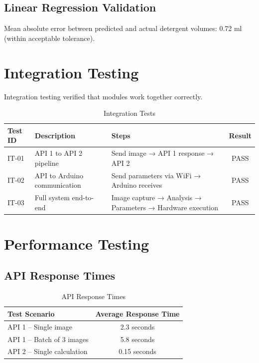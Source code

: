 \subsection{Linear Regression Validation}
Mean absolute error between predicted and actual detergent volumes: 0.72 ml (within acceptable tolerance).

\section{Integration Testing}
Integration testing verified that modules work together correctly.

\begin{table}[H]
    \centering
    \small
    \begin{tabularx}{\textwidth}{|l|X|X|c|}
        \hline
        \textbf{Test ID} & \textbf{Description} & \textbf{Steps} & \textbf{Result} \\
        \hline
        IT-01 & API 1 to API 2 pipeline & Send image → API 1 response → API 2 & PASS \\
        \hline
        IT-02 & API to Arduino communication & Send parameters via WiFi → Arduino receives & PASS \\
        \hline
        IT-03 & Full system end-to-end & Image capture → Analysis → Parameters → Hardware execution & PASS \\
        \hline
    \end{tabularx}
    \caption{Integration Tests}
    \label{tab:integration}
\end{table}


\section{Performance Testing}

\subsection{API Response Times}
\begin{table}[H]
    \centering
    \begin{tabular}{|l|c|}
        \hline
        \textbf{Test Scenario} & \textbf{Average Response Time} \\
        \hline
        API 1 – Single image & 2.3 seconds \\
        \hline
        API 1 – Batch of 3 images & 5.8 seconds \\
        \hline
        API 2 – Single calculation & 0.15 seconds \\
        \hline
    \end{tabular}
    \caption{API Response Times}
    \label{tab:perf_api}
\end{table}

